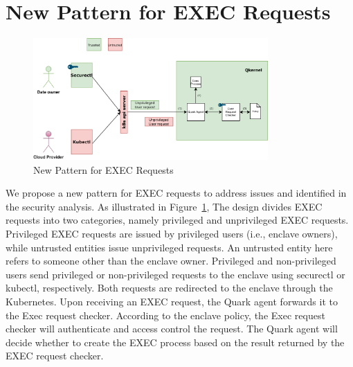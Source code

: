 \section{New Pattern for EXEC Requests}
\label{sec:design_EXEC_Requests}
\begin{figure}[!htb]
    \centering
    \includegraphics[width=0.8\textwidth]{images/new_pattern_of_exec.png}
    \caption[New Pattern for EXEC Requests]{New Pattern for EXEC Requests}
    \label{fig:new_pattern_of_exec}
\end{figure}

We propose a new pattern for EXEC requests to address issues  and  identified in the security analysis. As illustrated in Figure~\ref{fig:new_pattern_of_exec}, The design divides EXEC requests into two categories, namely privileged and unprivileged EXEC requests. Privileged EXEC requests are issued by privileged users 
(i.e., enclave owners), while untrusted entities issue unprivileged requests. An untrusted entity here refers to someone other than the enclave owner. Privileged and non-privileged users send privileged or non-privileged requests to the enclave using securectl or kubectl, respectively. Both requests
are redirected to the enclave through the Kubernetes. Upon receiving an EXEC request, the Quark agent forwards it to the Exec request checker. According to the enclave policy, the Exec request checker will authenticate and access control the request. The Quark agent will decide whether to create the 
EXEC process based on the result returned by the EXEC request checker.






